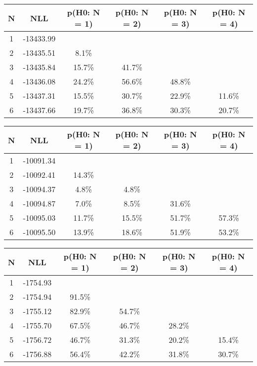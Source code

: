 \begin{table}[htb]
	\begin{center}
{\footnotesize\renewcommand{\arraystretch}{1.4}
		\begin{tabular}{cc||cccc}
			N & NLL & p(H0: N = 1) & p(H0: N = 2) & p(H0: N = 3) & p(H0: N = 4)\\ 
		\hline
1 & -13433.99 & & & & \\
2 & -13435.51 & 8.1\% & & & \\
3 & -13435.84 & 15.7\% & 41.7\% & & \\
4 & -13436.08 & 24.2\% & 56.6\% & 48.8\% & \\
5 & -13437.31 & 15.5\% & 30.7\% & 22.9\% & 11.6\% \\
6 & -13437.66 & 19.7\% & 36.8\% & 30.3\% & 20.7\% \\
	\end{tabular}
		\label{tab:lab}
	}
	\end{center}\end{table}

\begin{table}[htb]
	\begin{center}
{\footnotesize\renewcommand{\arraystretch}{1.4}
		\begin{tabular}{cc||cccc}
			N & NLL & p(H0: N = 1) & p(H0: N = 2) & p(H0: N = 3) & p(H0: N = 4)\\ 
		\hline
1 & -10091.34 & & & & \\
2 & -10092.41 & 14.3\% & & & \\
3 & -10094.37 & 4.8\% & 4.8\% & & \\
4 & -10094.87 & 7.0\% & 8.5\% & 31.6\% & \\
5 & -10095.03 & 11.7\% & 15.5\% & 51.7\% & 57.3\% \\
6 & -10095.50 & 13.9\% & 18.6\% & 51.9\% & 53.2\% \\
	\end{tabular}
		\label{tab:lab}
	}
	\end{center}\end{table}

\begin{table}[htb]
	\begin{center}
{\footnotesize\renewcommand{\arraystretch}{1.4}
		\begin{tabular}{cc||cccc}
			N & NLL & p(H0: N = 1) & p(H0: N = 2) & p(H0: N = 3) & p(H0: N = 4)\\ 
		\hline
1 & -1754.93 & & & & \\
2 & -1754.94 & 91.5\% & & & \\
3 & -1755.12 & 82.9\% & 54.7\% & & \\
4 & -1755.70 & 67.5\% & 46.7\% & 28.2\% & \\
5 & -1756.72 & 46.7\% & 31.3\% & 20.2\% & 15.4\% \\
6 & -1756.88 & 56.4\% & 42.2\% & 31.8\% & 30.7\% \\
	\end{tabular}
		\label{tab:lab}
	}
	\end{center}\end{table}

